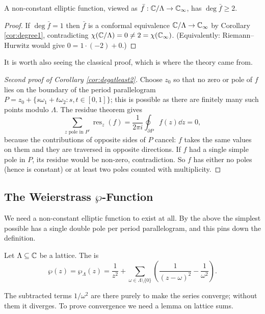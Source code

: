 \documentclass[a4paper]{scrartcl}
\newcommand{\Cinf}{\C_\infty}
\newcommand{\res}{\operatorname{res}}
\begin{document}
\begin{corollary}\label{cor:degatleast2}
	A non-constant elliptic function, viewed as $\bar f : \C/\Lambda \to \Cinf$, has
	$\deg \bar f \geq 2$.
\end{corollary}

\begin{proof}
	If $\deg\bar f = 1$ then $\bar f$ is a conformal equivalence $\C/\Lambda \to \Cinf$ by
	Corollary \ref{cor:degree1}, contradicting $\chi(\C/\Lambda) = 0 \neq 2 = \chi(\Cinf)$.
	(Equivalently: Riemann--Hurwitz would give $0 = 1\cdot(-2) + 0$.)
\end{proof}

It is worth also seeing the classical proof, which is where the theory came from.

\begin{proof}[Second proof of Corollary \ref{cor:degatleast2}]
	Choose $z_0$ so that no zero or pole of $f$ lies on the boundary of the period
	parallelogram $P = z_0 + \{s\omega_1 + t\omega_2 : s,t\in[0,1]\}$; this is possible as
	there are finitely many such points modulo $\Lambda$. The residue theorem gives
	$$
	\sum_{z \text{ pole in } P^\circ} \res_z(f) = \frac{1}{2\pi i}\oint_{\partial P} f(z)\dd z = 0,
	$$
	because the contributions of opposite sides of $P$ cancel: $f$ takes the same values on
	them and they are traversed in opposite directions. If $f$ had a single simple pole in
	$P$, its residue would be non-zero, contradiction. So $f$ has either no poles (hence is
	constant) or at least two poles counted with multiplicity.
\end{proof}

\subsection{The Weierstrass $\wp$-Function}

We need a non-constant elliptic function to exist at all. By the above the simplest
possible has a single double pole per period parallelogram, and this pins down the
definition.

\begin{definition}
	Let $\Lambda \subseteq \mathbb{C}$ be a lattice. The  is
	$$
	\wp(z) = \wp_\Lambda(z) = \frac{1}{z^2} + \sum_{\omega \in \Lambda\setminus\{0\}}
	\left(\frac{1}{(z-\omega)^2} - \frac{1}{\omega^2}\right).
	$$
\end{definition}

The subtracted terms $1/\omega^2$ are there purely to make the series converge; without
them it diverges. To prove convergence we need a lemma on lattice sums.
\end{document}
